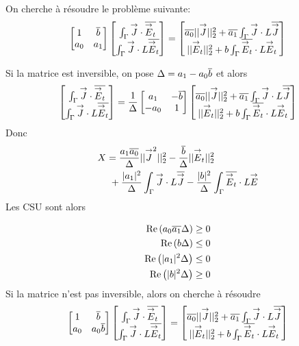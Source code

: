 		On cherche à résoudre le problème suivante:
		\[
			\begin{bmatrix}
				1 & \conj{b} \\
				a_0 & a_1
			\end{bmatrix}
			\begin{bmatrix}
				\int_\Gamma \vJ \cdot \conj{\vE_t} \\
				\int_\Gamma \vJ\cdot L\conj{\vE_t}
			\end{bmatrix}
			=
			\begin{bmatrix}
				\conj{a_0}||\vJ||_2^2 + \conj{a_1}\int_\Gamma \vJ \cdot L\conj{\vJ} \\
				||\vE_t||_2^2 + b\int_\Gamma \conj{\vE_t} \cdot L\vE_t
			\end{bmatrix}
		\]

		Si la matrice est inversible, on pose $\Delta = a_1 - a_0\conj{b}$ et alors
		\[
		\begin{bmatrix}
			\int_\Gamma \vJ \cdot \conj{\vE_t} \\
			\int_\Gamma \vJ\cdot L\conj{\vE_t}
		\end{bmatrix}
		=\frac{1}{\Delta}
		\begin{bmatrix}
			a_1 & -\conj{b} \\
			-a_0 & 1
		\end{bmatrix}
		\begin{bmatrix}
			\conj{a_0}||\vJ||_2^2 + \conj{a_1}\int_\Gamma \vJ \cdot L\conj{\vJ} \\
			||\vE_t||_2^2 + b\int_\Gamma \conj{\vE_t} \cdot L\vE_t
		\end{bmatrix}
		\]
		Donc
		\begin{align*}
			X &=  \frac{a_1\conj{a_0}}{\Delta}||\vJ^2||_2^2 - \frac{\conj{b}}{\Delta}||\vE_t||_2^2 \\
			&~+\frac{|a_1|^2}{\Delta}\int_\Gamma\vJ\cdot L \conj{\vJ} - \frac{|b|^2}{\Delta}\int_\Gamma\conj{\vE_t}\cdot L\vE
		\end{align*}
		Les CSU sont alors

			\begin{align}
			\Re\left(a_0\conj{a_1}\Delta\right) &\ge 0\\
			\Re\left(b\Delta\right) &\le 0\\
			\Re\left(|a_1|^2\Delta\right) &\le 0\\
			\Re\left(|b|^2\Delta\right) &\ge 0
		\end{align}
		Si la matrice n'est pas inversible, alors on cherche à résoudre
		\[
			\begin{bmatrix}
				1 & \conj{b} \\
				a_0 & a_0\conj{b}
			\end{bmatrix}
			\begin{bmatrix}
				\int_\Gamma \vJ \cdot \conj{\vE_t} \\
				\int_\Gamma \vJ \cdot L\conj{\vE_t}
			\end{bmatrix}
			=
			\begin{bmatrix}
				\conj{a_0}||\vJ||_2^2 + \conj{a_1}\int_\Gamma \vJ \cdot L\conj{\vJ} \\
				||\vE_t||_2^2 + b\int_\Gamma \conj{\vE_t} \cdot L\vE_t
			\end{bmatrix}
		\]

